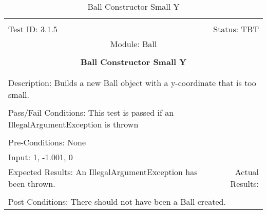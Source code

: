 \documentclass[titlepage]{article}
\begin{document}
\begin{center}%
\begin{table}[h!]
\begin{tabular}{|l r|}\hline&\\[-2mm]
	Test ID: 3.1.5	&Status: TBT\\[-3mm]
	\multicolumn{2}{|c|}{Module: Ball}\\&\\
	\multicolumn{2}{|c|}{\textbf{\large{Ball Constructor Small Y}}}\\&\\\hline&\\[-3mm]
	\multicolumn{2}{|p{\textwidth}|}{Description: Builds a new Ball object with a y-coordinate that is too small.}\\[1mm]\hline&\\[-3mm]
	\multicolumn{2}{|p{\textwidth}|}{Pass/Fail Conditions: This test is passed if an IllegalArgumentException is thrown}\\[1mm]\hline&\\[-3mm]
	\multicolumn{2}{|p{\textwidth}|}{Pre-Conditions: None}\\[4mm]
	\multicolumn{2}{|p{\textwidth}|}{Input: 1, -1.001, 0}\\[2mm]\hline
	\multicolumn{1}{|p{0.49\textwidth}}{Expected Results: An IllegalArgumentException has been thrown.}	&\multicolumn{1}{|p{0.45\textwidth}|}{Actual Results:}\\\hline&\\[-3mm]
	\multicolumn{2}{|p{\textwidth}|}{Post-Conditions: There should not have been a Ball created.}\\\hline
\end{tabular}
\caption{Ball Constructor Small Y}
\end{table}
\end{center}
\newpage
\end{document}

